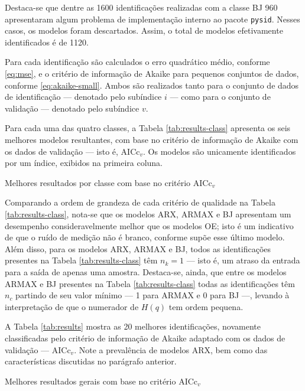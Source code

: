 \documentclass{ppgeesa}
\begin{document}
Destaca-se que dentre as 1600 identificações realizadas com a classe BJ 960 apresentaram algum problema de implementação interno ao pacote \texttt{pysid}.
Nesses casos, os modelos foram descartados.
Assim, o total de modelos efetivamente identificados é de 1120.

Para cada identificação são calculados o erro quadrático médio, conforme \eqref{eq:mse}, e o critério de informação de Akaike para pequenos conjuntos de dados, conforme \eqref{eq:akaike-small}.
Ambos são realizados tanto para o conjunto de dados de identificação --- denotado pelo subíndice $i$ --- como para o conjunto de validação --- denotado pelo subíndice $v$.

Para cada uma das quatro classes, a Tabela \ref{tab:results-class} apresenta os seis melhores modelos resultantes, com base no critério de informação de Akaike com os dados de validação --- isto é, $\text{AICc}_v$.
Os modelos são unicamente identificados por um índice, exibidos na primeira coluna.

\begin{table}
  \caption{Melhores resultados por classe com base no critério $\text{AICc}_v$}
  \label{tab:results-class}
  
\end{table}

Comparando a ordem de grandeza de cada critério de qualidade na Tabela \ref{tab:results-class}, nota-se que os modelos ARX, ARMAX e BJ apresentam um desempenho consideravelmente melhor que os modelos OE;
isto é um indicativo de que o ruído de medição não é branco, conforme supõe esse último modelo.
Além disso, para os modelos ARX, ARMAX e BJ, todos as identificações presentes na Tabela \ref{tab:results-class} têm $n_k = 1$ --- isto é, um atraso da entrada para a saída de apenas uma amostra.
Destaca-se, ainda, que entre os modelos ARMAX e BJ presentes na Tabela \ref{tab:results-class} todas as identificações têm $n_c$ partindo de seu valor mínimo --- 1 para ARMAX e 0 para BJ ---, levando à interpretação de que o numerador de $H(q)$ tem ordem pequena.

A Tabela \ref{tab:results} mostra as 20 melhores identificações, novamente classificadas pelo critério de informação de Akaike adaptado com os dados de validação --- $\text{AICc}_v$.
Note a prevalência de modelos ARX, bem como das características discutidas no parágrafo anterior.

\begin{table}
  \caption{Melhores resultados gerais com base no critério $\text{AICc}_v$}
  \label{tab:results}
  
\end{table}
\end{document}
